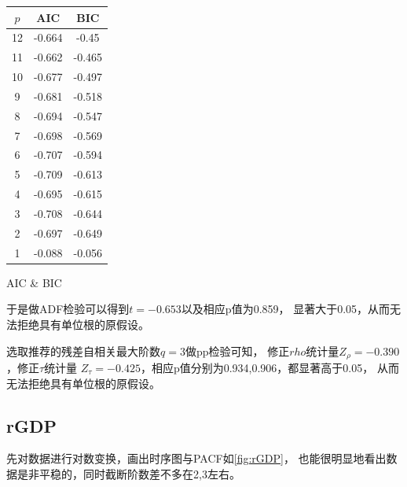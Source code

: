\documentclass[cn]{homework}
\begin{document}
    \begin{margintable}
        \centering
        \begin{tabular}{ccc}
            \toprule
            $p$ & AIC & BIC \\
            \midrule
            12 & -0.664 & -0.45 \\
            11 & -0.662 & -0.465 \\
            10 & -0.677 & -0.497 \\
            9 & -0.681 & -0.518 \\
            8 & -0.694 & -0.547 \\
            7 & -0.698 & -0.569 \\
            6 & -0.707 & -0.594 \\
            5 & -0.709 & -0.613 \\
            4 & -0.695 & -0.615 \\
            3 & -0.708 & -0.644 \\
            2 & -0.697 & -0.649 \\
            1 & -0.088 & -0.056 \\
            \bottomrule
        \end{tabular}
        \caption{AIC \& BIC}
        \label{tab: INDPROD ABIC}
    \end{margintable}

    于是做ADF检验可以得到$t=-0.653$以及相应p值为0.859，
    显著大于0.05，从而无法拒绝具有单位根的原假设。

    选取推荐的残差自相关最大阶数$q=3$做pp检验可知，
    修正$rho$统计量$Z_\rho=-0.390$，修正$\tau$统计量
    $Z_\tau=-0.425$，相应p值分别为0.934,0.906，都显著高于0.05，
    从而无法拒绝具有单位根的原假设。

    \subsection{rGDP}
    先对数据进行对数变换，画出时序图与PACF如\cref{fig:rGDP}，
    也能很明显地看出数据是非平稳的，同时截断阶数差不多在2,3左右。
\end{document}
